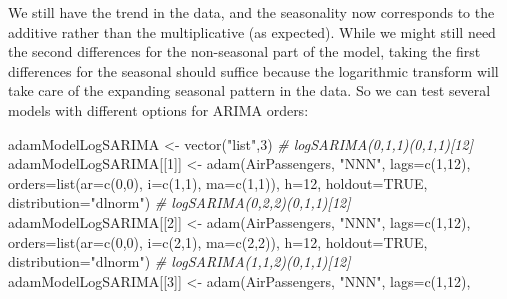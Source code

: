 \documentclass[
]{book}
\newenvironment{Shaded}{\begin{snugshade}}{\end{snugshade}}
\newcommand{\AttributeTok}[1]{\textcolor[rgb]{0.77,0.63,0.00}{#1}}
\newcommand{\CommentTok}[1]{\textcolor[rgb]{0.56,0.35,0.01}{\textit{#1}}}
\newcommand{\ConstantTok}[1]{\textcolor[rgb]{0.00,0.00,0.00}{#1}}
\newcommand{\DecValTok}[1]{\textcolor[rgb]{0.00,0.00,0.81}{#1}}
\newcommand{\FunctionTok}[1]{\textcolor[rgb]{0.00,0.00,0.00}{#1}}
\newcommand{\NormalTok}[1]{#1}
\newcommand{\OtherTok}[1]{\textcolor[rgb]{0.56,0.35,0.01}{#1}}
\newcommand{\StringTok}[1]{\textcolor[rgb]{0.31,0.60,0.02}{#1}}
\theoremstyle{definition}
\theoremstyle{definition}
\theoremstyle{definition}
\theoremstyle{definition}
\theoremstyle{remark}
\begin{document}
We still have the trend in the data, and the seasonality now corresponds to the additive rather than the multiplicative (as expected). While we might still need the second differences for the non-seasonal part of the model, taking the first differences for the seasonal should suffice because the logarithmic transform will take care of the expanding seasonal pattern in the data. So we can test several models with different options for ARIMA orders:

\begin{Shaded}
\begin{Highlighting}[]
\NormalTok{adamModelLogSARIMA }\OtherTok{\textless{}{-}} \FunctionTok{vector}\NormalTok{(}\StringTok{"list"}\NormalTok{,}\DecValTok{3}\NormalTok{)}
\CommentTok{\# logSARIMA(0,1,1)(0,1,1)[12]}
\NormalTok{adamModelLogSARIMA[[}\DecValTok{1}\NormalTok{]] }\OtherTok{\textless{}{-}}
  \FunctionTok{adam}\NormalTok{(AirPassengers, }\StringTok{"NNN"}\NormalTok{, }\AttributeTok{lags=}\FunctionTok{c}\NormalTok{(}\DecValTok{1}\NormalTok{,}\DecValTok{12}\NormalTok{),}
       \AttributeTok{orders=}\FunctionTok{list}\NormalTok{(}\AttributeTok{ar=}\FunctionTok{c}\NormalTok{(}\DecValTok{0}\NormalTok{,}\DecValTok{0}\NormalTok{), }\AttributeTok{i=}\FunctionTok{c}\NormalTok{(}\DecValTok{1}\NormalTok{,}\DecValTok{1}\NormalTok{), }\AttributeTok{ma=}\FunctionTok{c}\NormalTok{(}\DecValTok{1}\NormalTok{,}\DecValTok{1}\NormalTok{)),}
       \AttributeTok{h=}\DecValTok{12}\NormalTok{, }\AttributeTok{holdout=}\ConstantTok{TRUE}\NormalTok{, }\AttributeTok{distribution=}\StringTok{"dlnorm"}\NormalTok{)}
\CommentTok{\# logSARIMA(0,2,2)(0,1,1)[12]}
\NormalTok{adamModelLogSARIMA[[}\DecValTok{2}\NormalTok{]] }\OtherTok{\textless{}{-}}
  \FunctionTok{adam}\NormalTok{(AirPassengers, }\StringTok{"NNN"}\NormalTok{, }\AttributeTok{lags=}\FunctionTok{c}\NormalTok{(}\DecValTok{1}\NormalTok{,}\DecValTok{12}\NormalTok{),}
       \AttributeTok{orders=}\FunctionTok{list}\NormalTok{(}\AttributeTok{ar=}\FunctionTok{c}\NormalTok{(}\DecValTok{0}\NormalTok{,}\DecValTok{0}\NormalTok{), }\AttributeTok{i=}\FunctionTok{c}\NormalTok{(}\DecValTok{2}\NormalTok{,}\DecValTok{1}\NormalTok{), }\AttributeTok{ma=}\FunctionTok{c}\NormalTok{(}\DecValTok{2}\NormalTok{,}\DecValTok{2}\NormalTok{)),}
       \AttributeTok{h=}\DecValTok{12}\NormalTok{, }\AttributeTok{holdout=}\ConstantTok{TRUE}\NormalTok{, }\AttributeTok{distribution=}\StringTok{"dlnorm"}\NormalTok{)}
\CommentTok{\# logSARIMA(1,1,2)(0,1,1)[12]}
\NormalTok{adamModelLogSARIMA[[}\DecValTok{3}\NormalTok{]] }\OtherTok{\textless{}{-}}
  \FunctionTok{adam}\NormalTok{(AirPassengers, }\StringTok{"NNN"}\NormalTok{, }\AttributeTok{lags=}\FunctionTok{c}\NormalTok{(}\DecValTok{1}\NormalTok{,}\DecValTok{12}\NormalTok{),}

\end{Highlighting}
\end{Shaded}
\end{document}
